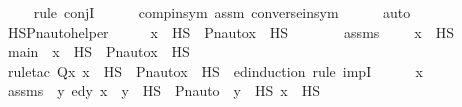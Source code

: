 \begin{isabellebody}
\ \ \ \ \isamarkupfalse%
{\isacharparenleft}{\kern0pt}rule\ conjI{\isacharparenright}{\kern0pt}\isanewline
\ \ \ \ \isamarkupfalse%
\ comp{\isacharunderscore}{\kern0pt}in{\isacharunderscore}{\kern0pt}sym\ assm\ converse{\isacharunderscore}{\kern0pt}in{\isacharunderscore}{\kern0pt}sym\isanewline
\ \ \ \ \isamarkupfalse%
\ auto\isanewline
{}\isamarkupfalse%
%
\endisatagproof
{\isafoldproof}%
%
\isadelimproof
\isanewline
%
\endisadelimproof
\isanewline
{}\isamarkupfalse%
\ HS{\isacharunderscore}{\kern0pt}Pn{\isacharunderscore}{\kern0pt}auto{\isacharunderscore}{\kern0pt}helper\ {\isacharcolon}{\kern0pt}\ {\isachardoublequoteopen}{\isasympi}\ {\isasymin}\ {\isasymG}\ {\isasymLongrightarrow}\ x\ {\isasymin}\ HS\ {\isasymLongrightarrow}\ Pn{\isacharunderscore}{\kern0pt}auto{\isacharparenleft}{\kern0pt}{\isasympi}{\isacharparenright}{\kern0pt}{\isacharbackquote}{\kern0pt}x\ {\isasymin}\ HS{\isachardoublequoteclose}\ \isanewline
%
\isadelimproof
%
\endisadelimproof
%
\isatagproof
{}\isamarkupfalse%
\ {\isacharminus}{\kern0pt}\ \isanewline
\ \ \isamarkupfalse%
\ assms\ {\isacharcolon}{\kern0pt}\ {\isachardoublequoteopen}{\isasympi}\ {\isasymin}\ {\isasymG}{\isachardoublequoteclose}\ {\isachardoublequoteopen}x\ {\isasymin}\ HS{\isachardoublequoteclose}\ \isanewline
\isanewline
\ \ \isamarkupfalse%
\ main\ {\isacharcolon}{\kern0pt}\ {\isachardoublequoteopen}x\ {\isasymin}\ HS\ {\isasymlongrightarrow}\ Pn{\isacharunderscore}{\kern0pt}auto{\isacharparenleft}{\kern0pt}{\isasympi}{\isacharparenright}{\kern0pt}{\isacharbackquote}{\kern0pt}x\ {\isasymin}\ HS{\isachardoublequoteclose}\ \isanewline
\ \ \isamarkupfalse%
\ {\isacharparenleft}{\kern0pt}rule{\isacharunderscore}{\kern0pt}tac\ Q{\isacharequal}{\kern0pt}{\isachardoublequoteopen}{\isasymlambda}x{\isachardot}{\kern0pt}\ x\ {\isasymin}\ HS\ {\isasymlongrightarrow}\ Pn{\isacharunderscore}{\kern0pt}auto{\isacharparenleft}{\kern0pt}{\isasympi}{\isacharparenright}{\kern0pt}{\isacharbackquote}{\kern0pt}x\ {\isasymin}\ HS{\isachardoublequoteclose}\ \ ed{\isacharunderscore}{\kern0pt}induction{\isacharcomma}{\kern0pt}\ rule\ impI{\isacharparenright}{\kern0pt}\isanewline
\ \ \ \ \isamarkupfalse%
\ x\ \isamarkupfalse%
\ assms{}\ {\isacharcolon}{\kern0pt}\ {\isachardoublequoteopen}{\isacharparenleft}{\kern0pt}{\isasymAnd}y{\isachardot}{\kern0pt}\ ed{\isacharparenleft}{\kern0pt}y{\isacharcomma}{\kern0pt}\ x{\isacharparenright}{\kern0pt}\ {\isasymLongrightarrow}\ y\ {\isasymin}\ HS\ {\isasymlongrightarrow}\ Pn{\isacharunderscore}{\kern0pt}auto{\isacharparenleft}{\kern0pt}{\isasympi}{\isacharparenright}{\kern0pt}\ {\isacharbackquote}{\kern0pt}\ y\ {\isasymin}\ HS{\isacharparenright}{\kern0pt}{\isachardoublequoteclose}\ {\isachardoublequoteopen}x\ {\isasymin}\ HS{\isachardoublequoteclose}\ \isanewline

\end{isabellebody}

